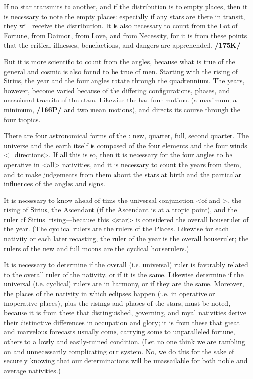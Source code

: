 If no star transmits to another, and if the distribution is to empty places, then it is necessary to note the empty places: especially if any stars are there in transit, they will receive the distribution. It is also necessary to count from the Lot of Fortune, from Daimon, from Love, and from
Necessity, for it is from these points that the critical illnesses, benefactions, and dangers are apprehended. \textbf{/175K/}

But it is more scientific to count from the angles, because what is true of the general and cosmic is also found to be true of men. Starting with the rising of Sirius, the year and the four angles rotate through the quadrennium. The years, however, become varied because of the differing configurations, phases, and occasional transits of the stars. Likewise the \Sun\xspace has four motions (a maximum, a minimum, \textbf{/166P/} and two mean motions), and directs its course through the four tropics. 

There are four astronomical forms of the \Moon: new, quarter, full, second quarter. The universe and the earth itself is composed of the four elements and the four winds <=directions>. If all this is so, then it is necessary for the four angles to be operative in <all> nativities, and it is necessary to count the years from them, and to make judgements from them about the stars at birth and the particular influences of the angles and signs. 

It is necessary to know ahead of time the universal conjunction <of \Sun\xspace and \Moon>, the rising of Sirius, the Ascendant (if the Ascendant is at a tropic point), and the ruler of Sirius’ rising—because this <star> is considered the overall houseruler of the year. (The cyclical rulers are the rulers of the Places. Likewise for each nativity or each later recasting, the ruler of the year is the overall houseruler; the rulers of the new and full moons are
the cyclical houserulers.)

It is necessary to determine if the overall (i.e. universal) ruler is favorably related to the overall ruler of the nativity, or if it is the same. Likewise determine if the universal (i.e. cyclical) rulers are in harmony, or if they are the same. Moreover, the places of the nativity in which eclipses happen (i.e. in operative or inoperative places), plus the risings and phases of the stars, must be noted, because it is from these that distinguished, governing, and royal nativities derive their distinctive differences in occupation and glory; it is from these that great and marvelous forecasts usually come, carrying some to unparalleled fortune, others to a lowly and easily-ruined condition. (Let no one think we are rambling on and unnecessarily complicating our system. No, we do this for
the sake of securely knowing that our determinations will be unassailable for both noble and average nativities.)

